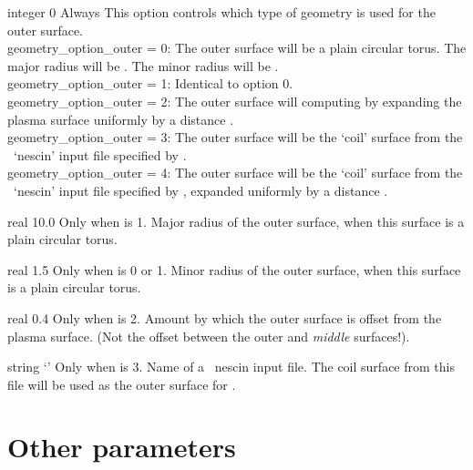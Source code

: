 {integer}
{0}
{Always}
{This option controls which type of geometry is used for the outer surface.\\

{\ttfamily geometry\_option\_outer} = 0: The outer surface will be a plain circular torus. The major radius will be .
     The minor radius will be .\\

{\ttfamily geometry\_option\_outer} = 1: Identical to option 0.\\

{\ttfamily geometry\_option\_outer} = 2: The outer surface will computing by expanding the plasma surface uniformly by a distance .\\

{\ttfamily geometry\_option\_outer} = 3: The outer surface will be the `coil' surface from the \nescoil~`nescin' input file specified by .\\

{\ttfamily geometry\_option\_outer} = 4: The outer surface will be the `coil' surface from the \nescoil~`nescin' input file specified by ,
expanded uniformly by a distance .
}

\myhrule

{real}
{10.0}
{Only when  is 1.}
{Major radius of the outer surface, when this surface is a plain circular torus.}

\myhrule

{real}
{1.5}
{Only when  is 0 or 1.}
{Minor radius of the outer surface, when this surface is a plain circular torus.}

\myhrule

{real}
{0.4}
{Only when  is 2.}
{Amount by which the outer surface is offset from the plasma surface.  (Not the offset between the outer and \emph{middle} surfaces!).}

\myhrule

{string}
{`'}
{Only when  is 3.}
{Name of a \nescoil~{\ttfamily nescin} input file. The coil surface from
this file will be used as the outer surface for \bdistrib.}

\section{Other parameters}

